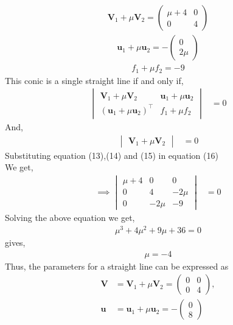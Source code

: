 \documentclass[10pt,a4paper]{report}
\newcommand{\myvec}[1]{\ensuremath{\begin{pmatrix}#1\end{pmatrix}}}
\let\vec\mathbf
\let\vec\mathbf
\newcommand{\mydet}[1]{\ensuremath{\begin{vmatrix}#1\end{vmatrix}}}
\providecommand{\brak}[1]{\ensuremath{\left(#1\right)}}
\begin{document}
\begin{multicols}{2}
\begin{align}
\vec{V}_1+\mu\vec{V}_2= \myvec{
\mu+4 & 0\\
0 & 4
}
\end{align}
\begin{align}
\vec{u}_1+\mu\vec{u}_2= -\myvec{
0\\
2\mu
}
\end{align}
\begin{align}
f_1+\mu f_2= -9
\end{align}
This conic is a single straight line if and only if, \\ \vspace{1mm}
\begin{align}
\mydet{\vec{V}_1 + \mu\vec{V}_2 & \vec{u}_1+\mu \vec{u}_2\\ \brak{\vec{u}_1+\mu \vec{u}_2}^{\top} & f_1 + \mu f_2} &= 0
\end{align}
And,\\
\begin{align}
\mydet{\vec{V}_1 + \mu\vec{V}_2} &= 0
\end{align}
Substituting equation (13),(14) and (15) in equation (16)\\ \vspace{1mm}
We get,\\ \vspace{1mm}
\begin{align}
\implies \mydet{\mu+4 & 0 & 0\\ 
0 & 4 & -2\mu \\
0 & -2\mu & -9
} &= 0
\end{align}
Solving the above equation we get,\\ \vspace{1mm}
\begin{align}
\mu^3 + 4\mu^2 + 9\mu + 36=0
\end{align}
gives,\\ \vspace{1mm}
\begin{align}
    \mu = -4
\end{align}
 Thus, the parameters for a straight line can be expressed as\\ \vspace{1mm}
 \begin{align}
	\vec{V} &= 
\vec{V}_1 + \mu\vec{V}_2
=\myvec{ 0 & 0 \\ 0 & 4},
\\
	\vec{u} &=
\vec{u}_1+\mu \vec{u}_2
	= -\myvec{
0\\
8
    }
\\

\end{align}
\end{multicols}
\end{document}
